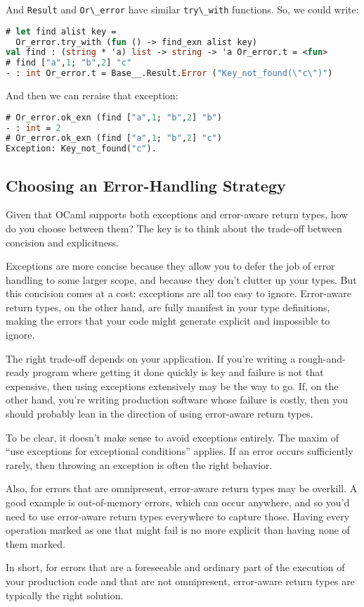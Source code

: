 And \passthrough{\lstinline!Result!} and
\passthrough{\lstinline!Or\_error!} have similar
\passthrough{\lstinline!try\_with!} functions. So, we could write:

\begin{lstlisting}[language=Caml]
# let find alist key =
  Or_error.try_with (fun () -> find_exn alist key)
val find : (string * 'a) list -> string -> 'a Or_error.t = <fun>
# find ["a",1; "b",2] "c"
- : int Or_error.t = Base__.Result.Error ("Key_not_found(\"c\")")
\end{lstlisting}

And then we can reraise that exception:

\begin{lstlisting}[language=Caml]
# Or_error.ok_exn (find ["a",1; "b",2] "b")
- : int = 2
# Or_error.ok_exn (find ["a",1; "b",2] "c")
Exception: Key_not_found("c").
\end{lstlisting}

\hypertarget{choosing-an-error-handling-strategy}{%
\subsection{Choosing an Error-Handling
Strategy}\label{choosing-an-error-handling-strategy}}

Given that OCaml supports both exceptions and error-aware return types,
how do you choose between them? The key is to think about the trade-off
between concision and
explicitness.

Exceptions are more concise because they allow you to defer the job of
error handling to some larger scope, and because they don't clutter up
your types. But this concision comes at a cost: exceptions are all too
easy to ignore. Error-aware return types, on the other hand, are fully
manifest in your type definitions, making the errors that your code
might generate explicit and impossible to
ignore.

The right trade-off depends on your application. If you're writing a
rough-and-ready program where getting it done quickly is key and failure
is not that expensive, then using exceptions extensively may be the way
to go. If, on the other hand, you're writing production software whose
failure is costly, then you should probably lean in the direction of
using error-aware return types.

To be clear, it doesn't make sense to avoid exceptions entirely. The
maxim of ``use exceptions for exceptional conditions'' applies. If an
error occurs sufficiently rarely, then throwing an exception is often
the right behavior.

Also, for errors that are omnipresent, error-aware return types may be
overkill. A good example is out-of-memory errors, which can occur
anywhere, and so you'd need to use error-aware return types everywhere
to capture those. Having every operation marked as one that might fail
is no more explicit than having none of them marked.

In short, for errors that are a foreseeable and ordinary part of the
execution of your production code and that are not omnipresent,
error-aware return types are typically the right solution.
